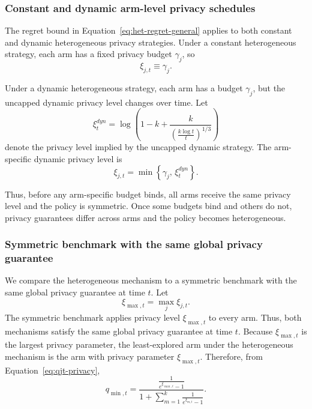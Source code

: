 \documentclass[mksc,nonblindrev]{informs3}
\begin{document}
\begin{APPENDICES}
\subsubsection{Constant and dynamic arm-level privacy schedules}
The regret bound in Equation~\eqref{eq:het-regret-general} applies to both constant and dynamic heterogeneous privacy strategies. Under a constant heterogeneous strategy, each arm has a fixed privacy budget $\gamma_j$, so
\begin{equation}
\label{eq:constant-het-xi}
\xi_{j,t}
\equiv
\gamma_j.
\end{equation}

Under a dynamic heterogeneous strategy, each arm has a budget $\gamma_j$, but the uncapped dynamic privacy level changes over time. Let
\begin{equation}
\label{eq:uncapped-dynamic-xi}
\xi_t^{dyn}
=
\log\left(
1-k+\frac{k}{\left(\frac{k\log t}{t}\right)^{1/3}}
\right)
\end{equation}
denote the privacy level implied by the uncapped dynamic strategy. The arm-specific dynamic privacy level is
\begin{equation}
\label{eq:dynamic-het-xi}
\xi_{j,t}
=
\min\left\{
\gamma_j,\,
\xi_t^{dyn}
\right\}.
\end{equation}

Thus, before any arm-specific budget binds, all arms receive the same privacy level and the policy is symmetric. Once some budgets bind and others do not, privacy guarantees differ across arms and the policy becomes heterogeneous.


\subsubsection{Symmetric benchmark with the same global privacy guarantee}

We compare the heterogeneous mechanism to a symmetric benchmark with the same
global privacy guarantee at time $t$. Let
\begin{equation}
\label{eq:xi-max-def}
\xi_{\max,t}
=
\max_j \xi_{j,t}.
\end{equation}
The symmetric benchmark applies privacy level $\xi_{\max,t}$ to every arm. Thus, both mechanisms satisfy the same global privacy guarantee at time $t$. Because $\xi_{\max,t}$ is the largest privacy parameter, the least-explored arm under the heterogeneous mechanism is the arm with privacy parameter $\xi_{\max,t}$. Therefore, from Equation~\eqref{eq:qjt-privacy},
\begin{equation}
\label{eq:qmin-privacy}
q_{\min,t}
=
\frac{
\frac{1}{e^{\xi_{\max,t}}-1}
}{
1+\sum_{m=1}^k \frac{1}{e^{\xi_{m,t}}-1}
}.
\end{equation}


\end{APPENDICES}
\end{document}
